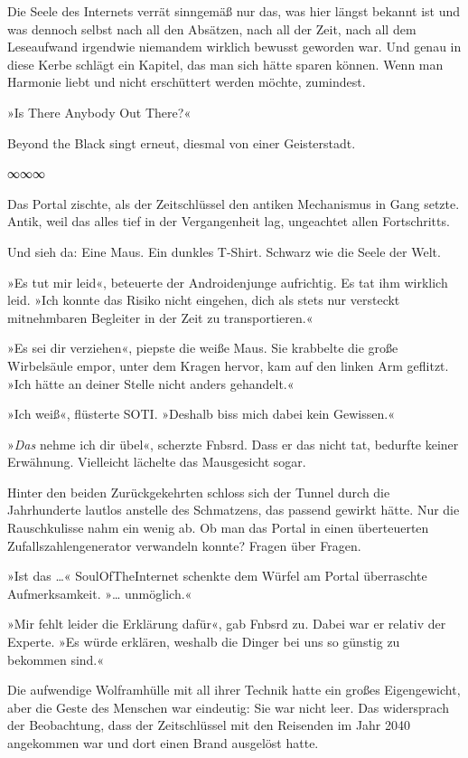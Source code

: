 Die Seele des Internets verrät sinngemäß nur das, was hier längst bekannt ist und was dennoch selbst nach all den Absätzen, nach all der Zeit, nach all dem Leseaufwand irgendwie niemandem wirklich bewusst geworden war. Und genau in diese Kerbe schlägt ein Kapitel, das man sich hätte sparen können. Wenn man Harmonie liebt und nicht erschüttert werden möchte, zumindest.

»Is There Anybody Out There?«

Beyond the Black singt erneut, diesmal von einer Geisterstadt.

\begin{center}
∞∞∞
\end{center}

Das Portal zischte, als der Zeitschlüssel den antiken Mechanismus in Gang setzte. Antik, weil das alles tief in der Vergangenheit lag, ungeachtet allen Fortschritts.

Und sieh da: Eine Maus. Ein dunkles T-Shirt. Schwarz wie die Seele der Welt.

»Es tut mir leid«, beteuerte der Androidenjunge aufrichtig. Es tat ihm wirklich leid. »Ich konnte das Risiko nicht eingehen, dich als stets nur versteckt mitnehmbaren Begleiter in der Zeit zu transportieren.«

»Es sei dir verziehen«, piepste die weiße Maus. Sie krabbelte die große Wirbelsäule empor, unter dem Kragen hervor, kam auf den linken Arm geflitzt. »Ich hätte an deiner Stelle nicht anders gehandelt.«

»Ich weiß«, flüsterte SOTI. »Deshalb biss mich dabei kein Gewissen.«

»\emph{Das} nehme ich dir übel«, scherzte Fnbsrd. Dass er das nicht tat, bedurfte keiner Erwähnung. Vielleicht lächelte das Mausgesicht sogar.

Hinter den beiden Zurückgekehrten schloss sich der Tunnel durch die Jahrhunderte lautlos anstelle des Schmatzens, das passend gewirkt hätte. Nur die Rauschkulisse nahm ein wenig ab. Ob man das Portal in einen überteuerten Zufallszahlengenerator verwandeln konnte? Fragen über Fragen.

»Ist das …« SoulOfTheInternet schenkte dem Würfel am Portal überraschte Aufmerksamkeit. »… unmöglich.«

»Mir fehlt leider die Erklärung dafür«, gab Fnbsrd zu. Dabei war er relativ der Experte. »Es würde erklären, weshalb die Dinger bei uns so günstig zu bekommen sind.«

Die aufwendige Wolframhülle mit all ihrer Technik hatte ein großes Eigengewicht, aber die Geste des Menschen war eindeutig: Sie war nicht leer. Das widersprach der Beobachtung, dass der Zeitschlüssel mit den Reisenden im Jahr 2040 angekommen war und dort einen Brand ausgelöst hatte.

